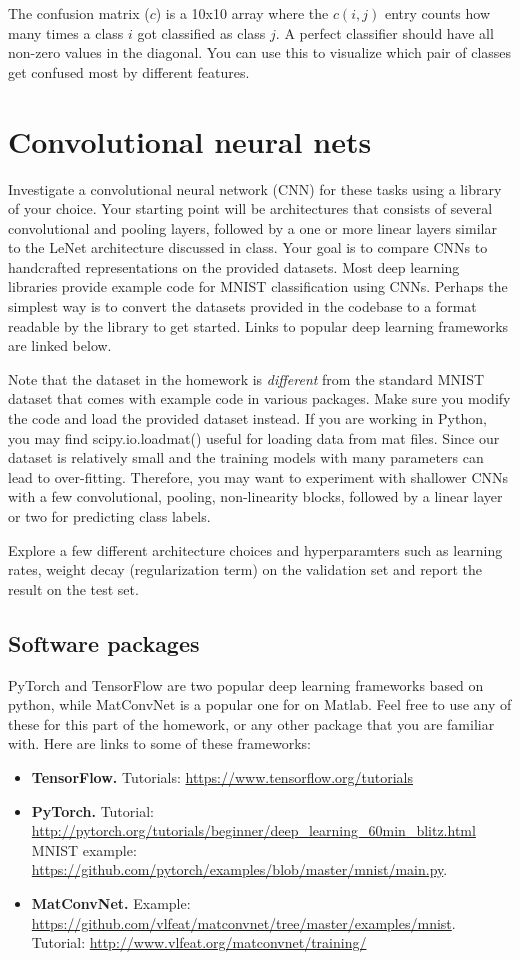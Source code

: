 \documentclass[10pt,letterpaper]{article}
\begin{document}
The confusion matrix ($c$) is a 10x10 array where the $c(i,j)$ entry counts how many times a class $i$ got classified as class $j$. A perfect classifier should have all non-zero values in the diagonal. You can use this to visualize which pair of classes get confused most by different features.


\section{Convolutional neural nets}
Investigate a convolutional neural network (CNN) for these tasks using a library of your choice. 
Your starting point will be architectures that consists of several convolutional and pooling layers, followed by a one or more linear layers similar to the LeNet architecture discussed in class. 
Your goal is to compare CNNs to handcrafted representations on the provided datasets. 
Most deep learning libraries provide example code for MNIST classification using CNNs. 
Perhaps the simplest way is to convert the datasets provided in the codebase to a format readable by the library to get started. Links to popular deep learning frameworks are linked below.

Note that the dataset in the homework is \emph{different} from the standard MNIST dataset that comes with example code in various packages. 
Make sure you modify the code and load the provided dataset instead. 
If you are working in Python, you may find scipy.io.loadmat() useful for loading data from mat files.
Since our dataset is relatively small and the training models with many parameters can lead to over-fitting. Therefore, you may want to experiment with shallower CNNs with a few convolutional, pooling, non-linearity blocks, followed by a linear layer or two for predicting class labels.

Explore a few different architecture choices and hyperparamters such as learning rates, weight decay (regularization term) on the validation set and report the result on the test set.


\subsection{Software packages}
PyTorch and TensorFlow are two popular deep learning frameworks based on python, while MatConvNet is a popular one for on Matlab. Feel free to use any of these for this part of the homework, or any other package that you are familiar with. Here are links to some of these frameworks:
\begin{itemize}
\item \textbf{TensorFlow.} Tutorials: \url{https://www.tensorflow.org/tutorials}
\item \textbf{PyTorch.} Tutorial: \url{http://pytorch.org/tutorials/beginner/deep_learning_60min_blitz.html}
MNIST example: \url{https://github.com/pytorch/examples/blob/master/mnist/main.py}.
\item \textbf{MatConvNet.} 
Example: \url{https://github.com/vlfeat/matconvnet/tree/master/examples/mnist}. 
Tutorial: \url{http://www.vlfeat.org/matconvnet/training/}
\end{itemize}
\end{document}

